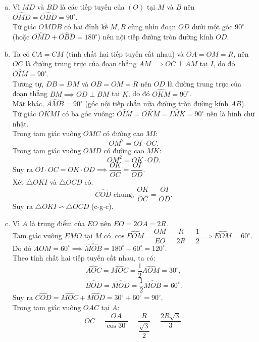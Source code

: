 \begin{bt}
{\begin{center}
\end{center}
\begin{enumerate}[a)]
    \item Vì $MD$ và $BD$ là các tiếp tuyến của $(O)$ tại $M$ và $B$ nên $\widehat{OMD} = \widehat{OBD} = 90^\circ$.\\
    Tứ giác $OMDB$ có hai đỉnh kề $M, B$ cùng nhìn đoạn $OD$ dưới một góc $90^\circ$ (hoặc $\widehat{OMD} + \widehat{OBD} = 180^\circ$) nên nội tiếp đường tròn đường kính $OD$.
    \item Ta có $CA = CM$ (tính chất hai tiếp tuyến cắt nhau) và $OA = OM = R$, nên $OC$ là đường trung trực của đoạn thẳng $AM \implies OC \perp AM$ tại $I$, do đó $\widehat{OIM} = 90^\circ$.\\
    Tương tự, $DB = DM$ và $OB = OM = R$ nên $OD$ là đường trung trực của đoạn thẳng $BM \implies OD \perp BM$ tại $K$, do đó $\widehat{OKM} = 90^\circ$.\\
    Mặt khác, $\widehat{AMB} = 90^\circ$ (góc nội tiếp chắn nửa đường tròn đường kính $AB$).\\
    Tứ giác $OKMI$ có ba góc vuông: $\widehat{OIM} = \widehat{OKM} = \widehat{IMK} = 90^\circ$ nên là hình chữ nhật.\\
    Trong tam giác vuông $OMC$ có đường cao $MI$:
    $$OM^2 = OI \cdot OC.$$
    Trong tam giác vuông $OMD$ có đường cao $MK$:
    $$OM^2 = OK \cdot OD.$$
    Suy ra $OI \cdot OC = OK \cdot OD \implies \dfrac{OK}{OC} = \dfrac{OI}{OD}$.\\
    Xét $\triangle OKI$ và $\triangle OCD$ có:
    $$\widehat{COD}\text{ chung, } \dfrac{OK}{OC} = \dfrac{OI}{OD}.$$
    Suy ra $\triangle OKI \backsim \triangle OCD$ (c-g-c).
    \item Vì $A$ là trung điểm của $EO$ nên $EO = 2OA = 2R$.\\
    Tam giác vuông $EMO$ tại $M$ có $\cos \widehat{EOM} = \dfrac{OM}{EO} = \dfrac{R}{2R} = \dfrac{1}{2} \implies \widehat{EOM} = 60^\circ$.\\
    Do đó $\widehat{AOM} = 60^\circ \implies \widehat{MOB} = 180^\circ - 60^\circ = 120^\circ$.\\
    Theo tính chất hai tiếp tuyến cắt nhau, ta có:
    $$\widehat{AOC} = \widehat{MOC} = \dfrac{1}{2}\widehat{AOM} = 30^\circ,$$
    $$\widehat{BOD} = \widehat{MOD} = \dfrac{1}{2}\widehat{MOB} = 60^\circ.$$
    Suy ra $\widehat{COD} = \widehat{MOC} + \widehat{MOD} = 30^\circ + 60^\circ = 90^\circ$.\\
    Trong tam giác vuông $OAC$ tại $A$:
    $$OC = \dfrac{OA}{\cos 30^\circ} = \dfrac{R}{\dfrac{\sqrt{3}}{2}} = \dfrac{2R\sqrt{3}}{3}.$$

\end{enumerate}}
\end{bt}
